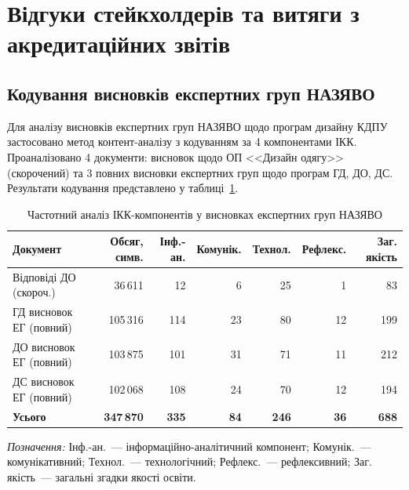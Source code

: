 \clearpage

\section{Відгуки стейкхолдерів та витяги з акредитаційних звітів}\label{app:stakeholders}

\subsection{Кодування висновків експертних груп НАЗЯВО}

Для аналізу висновків експертних груп НАЗЯВО щодо програм дизайну КДПУ застосовано метод контент-аналізу з кодуванням за 4 компонентами ІКК. Проаналізовано 4 документи: висновок щодо ОП <<Дизайн одягу>> (скорочений) та 3 повних висновки експертних груп щодо програм ГД, ДО, ДС. Результати кодування представлено у таблиці~\ref{tab:app-expert-coding}.

\begin{table}[htbp]
\centering
\caption{Частотний аналіз ІКК-компонентів у висновках експертних груп НАЗЯВО}\label{tab:app-expert-coding}
\small
\begin{tabularx}{\textwidth}{@{}p{}rrrrrr@{}}
\toprule
\textbf{Документ} & \textbf{Обсяг, симв.} & \textbf{Інф.-ан.} & \textbf{Комунік.} & \textbf{Технол.} & \textbf{Рефлекс.} & \textbf{Заг. якість} \\
\midrule
Відповіді ДО (скороч.) & 36\,611 & 12 & 6 & 25 & 1 & 83 \\
ГД висновок ЕГ (повний) & 105\,316 & 114 & 23 & 80 & 12 & 199 \\
ДО висновок ЕГ (повний) & 103\,875 & 101 & 31 & 71 & 11 & 212 \\
ДС висновок ЕГ (повний) & 102\,068 & 108 & 24 & 70 & 12 & 194 \\
\addlinespace
\midrule
\textbf{Усього} & \textbf{347\,870} & \textbf{335} & \textbf{84} & \textbf{246} & \textbf{36} & \textbf{688} \\
\bottomrule
\end{tabularx}
\end{table}

\textit{Позначення:} Інф.-ан.~--- інформаційно-аналітичний компонент; Комунік.~--- комунікативний; Технол.~--- технологічний; Рефлекс.~--- рефлексивний; Заг. якість~--- загальні згадки якості освіти.

